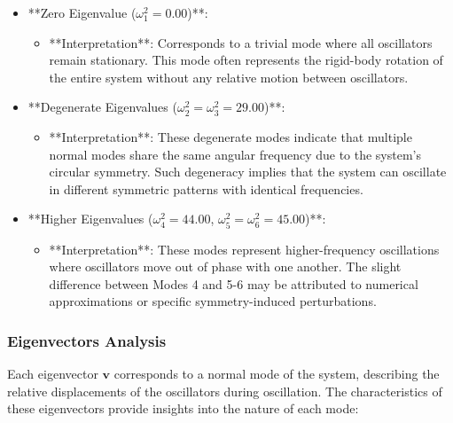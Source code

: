 \documentclass[12pt]{report} %
\begin{document}
\begin{itemize}
    \item **Zero Eigenvalue (\( \omega_1^2 = 0.00 \))**:
    \begin{itemize}
        \item **Interpretation**: Corresponds to a trivial mode where all oscillators remain stationary. This mode often represents the rigid-body rotation of the entire system without any relative motion between oscillators.
    \end{itemize}
    
    \item **Degenerate Eigenvalues (\( \omega_2^2 = \omega_3^2 = 29.00 \))**:
    \begin{itemize}
        \item **Interpretation**: These degenerate modes indicate that multiple normal modes share the same angular frequency due to the system's circular symmetry. Such degeneracy implies that the system can oscillate in different symmetric patterns with identical frequencies.
    \end{itemize}
    
    \item **Higher Eigenvalues (\( \omega_4^2 = 44.00 \), \( \omega_5^2 = \omega_6^2 = 45.00 \))**:
    \begin{itemize}
        \item **Interpretation**: These modes represent higher-frequency oscillations where oscillators move out of phase with one another. The slight difference between Modes 4 and 5-6 may be attributed to numerical approximations or specific symmetry-induced perturbations.
    \end{itemize}
\end{itemize}

\subsubsection{Eigenvectors Analysis}
\label{subsubsec:part2_task2_eigenvectors_discussion}

Each eigenvector \( \mathbf{v} \) corresponds to a normal mode of the system, describing the relative displacements of the oscillators during oscillation. The characteristics of these eigenvectors provide insights into the nature of each mode:
\end{document}
